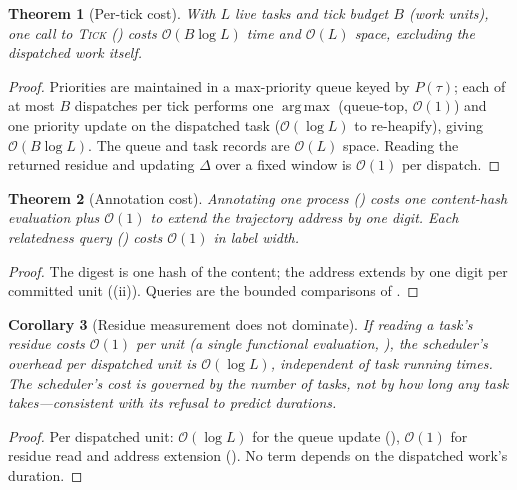 \documentclass[twocolumn,10pt,a4paper]{article}
\theoremstyle{thmstyle}
\newtheorem{theorem}{Theorem}[section]
\newtheorem{corollary}[theorem]{Corollary}
\theoremstyle{definition}
\theoremstyle{remark}
\newcommand{\task}{\tau}
\DeclareMathOperator*{\argmax}{arg\,max}
\begin{document}
\begin{theorem}[Per-tick cost]
\label{thm:pertick}
With $L$ live tasks and tick budget $B$ (work units), one call to
\textsc{Tick} () costs
$\mathcal{O}(B\log L)$ time and $\mathcal{O}(L)$ space, excluding the
dispatched work itself.
\end{theorem}

\begin{proof}
Priorities are maintained in a max-priority queue keyed by $P(\task)$;
each of at most $B$ dispatches per tick performs one $\argmax$
(queue-top, $\mathcal{O}(1)$) and one priority update on the dispatched
task ($\mathcal{O}(\log L)$ to re-heapify), giving $\mathcal{O}(B\log L)$.
The queue and task records are $\mathcal{O}(L)$ space. Reading the
returned residue and updating $\Delta$ over a fixed window is
$\mathcal{O}(1)$ per dispatch.
\end{proof}

\begin{theorem}[Annotation cost]
\label{thm:annot-cost}
Annotating one process () costs one content-hash
evaluation plus $\mathcal{O}(1)$ to extend the trajectory address by one
digit. Each relatedness query () costs $\mathcal{O}(1)$
in label width.
\end{theorem}

\begin{proof}
The digest is one hash of the content; the address extends by one digit
per committed unit ((ii)). Queries are the bounded
comparisons of .
\end{proof}

\begin{corollary}[Residue measurement does not dominate]
\label{cor:nondominate}
If reading a task's residue costs $\mathcal{O}(1)$ per unit (a single
functional evaluation, ), the scheduler's overhead per
dispatched unit is $\mathcal{O}(\log L)$, independent of task running
times. The scheduler's cost is governed by the number of tasks, not by
how long any task takes---consistent with its refusal to predict
durations.
\end{corollary}

\begin{proof}
Per dispatched unit: $\mathcal{O}(\log L)$ for the queue update
(), $\mathcal{O}(1)$ for residue read and address
extension (). No term depends on the dispatched
work's duration.
\end{proof}
\end{document}
